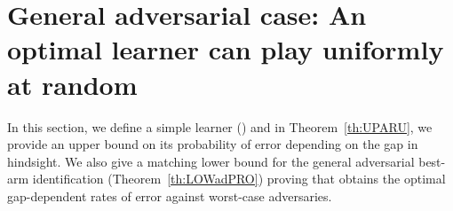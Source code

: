 \section{General adversarial case: An optimal 
	learner can play uniformly at random}
\label{s:ULGenAd}
%
In this section, we define a simple learner  (\RULE{}) and in Theorem~\ref{th:UPARU}, we 
provide an upper bound on its probability of error 
 depending on the gap in hindsight. 
We also give  a matching lower bound for the general 
adversarial best-arm identification (Theorem~\ref{th:LOWadPRO}) 
proving that \RULE{} obtains the optimal gap-dependent rates of error against worst-case adversaries.
%
%
%

